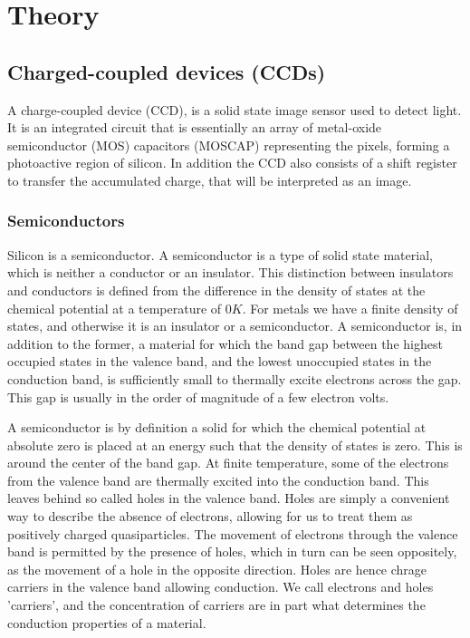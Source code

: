 \documentclass[../main.tex]{subfiles}
\begin{document}
	
	\chapter{Theory}
	\section{Charged-coupled devices (CCDs)}
	A charge-coupled device (CCD), is a solid state image sensor used to detect light. It is an integrated circuit that is essentially an array of metal-oxide semiconductor (MOS) capacitors (MOSCAP) representing the pixels, forming a photoactive region of silicon. In addition the CCD also consists of a shift register to transfer the accumulated charge, that will be interpreted as an image. 
	
	\subsection{Semiconductors}
	Silicon is a semiconductor. A semiconductor is a type of solid state material, which is neither a conductor or an insulator. This distinction between insulators and conductors is defined from the difference in the density of states at the chemical potential at a temperature of $0K$\cite{solidstatephysicsbook}. For metals we have a finite density of states, and otherwise it is an insulator or a semiconductor. A semiconductor is, in addition to the former, a material for which the band gap between the highest occupied states in the valence band, and the lowest unoccupied states in the conduction band, is sufficiently small to thermally excite electrons across the gap. This gap is usually in the order of magnitude of a few electron volts. 
	
	A semiconductor is by definition a solid for which the chemical potential at absolute zero is placed at an energy such that the density of states is zero. This is around the center of the band gap. At finite temperature, some of the electrons from the valence band are thermally excited into the conduction band. This leaves behind so called holes in the valence band. Holes are simply a convenient way to describe the absence of electrons, allowing for us to treat them as positively charged quasiparticles. The movement of electrons through the valence band is permitted by the presence of holes, which in turn can be seen oppositely, as the movement of a hole in the opposite direction. Holes are hence chrage carriers in the valence band allowing conduction. We call electrons and holes 'carriers', and the concentration of carriers are in part what determines the conduction properties of a material. 
	
\end{document}
